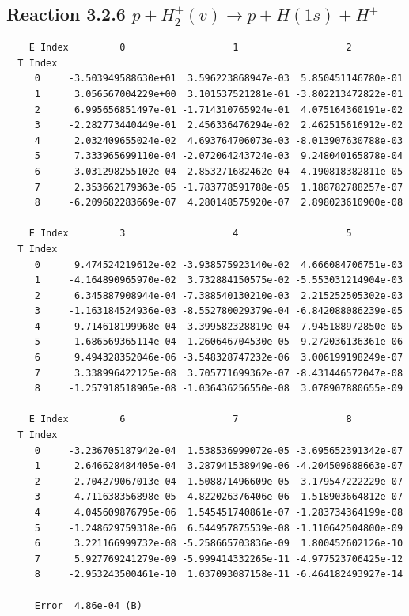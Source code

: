 \documentclass[12pt,dvipdfmx]{article}
\begin{document}
\newpage
\subsection{
Reaction 3.2.6 $   p + H_2^+(v) \rightarrow p + H(1s) + H^+$}


\begin{small}\begin{verbatim}
    E Index         0                   1                   2
  T Index
     0     -3.503949588630e+01  3.596223868947e-03  5.850451146780e-01
     1      3.056567004229e+00  3.101537521281e-01 -3.802213472822e-01
     2      6.995656851497e-01 -1.714310765924e-01  4.075164360191e-02
     3     -2.282773440449e-01  2.456336476294e-02  2.462515616912e-02
     4      2.032409655024e-02  4.693764706073e-03 -8.013907630788e-03
     5      7.333965699110e-04 -2.072064243724e-03  9.248040165878e-04
     6     -3.031298255102e-04  2.853271682462e-04 -4.190818382811e-05
     7      2.353662179363e-05 -1.783778591788e-05  1.188782788257e-07
     8     -6.209682283669e-07  4.280148575920e-07  2.898023610900e-08

    E Index         3                   4                   5
  T Index
     0      9.474524219612e-02 -3.938575923140e-02  4.666084706751e-03
     1     -4.164890965970e-02  3.732884150575e-02 -5.553031214904e-03
     2      6.345887908944e-04 -7.388540130210e-03  2.215252505302e-03
     3     -1.163184524936e-03 -8.552780029379e-04 -6.842088086239e-05
     4      9.714618199968e-04  3.399582328819e-04 -7.945188972850e-05
     5     -1.686569365114e-04 -1.260646704530e-05  9.272036136361e-06
     6      9.494328352046e-06 -3.548328747232e-06  3.006199198249e-07
     7      3.338996422125e-08  3.705771699362e-07 -8.431446572047e-08
     8     -1.257918518905e-08 -1.036436256550e-08  3.078907880655e-09

    E Index         6                   7                   8
  T Index
     0     -3.236705187942e-04  1.538536999072e-05 -3.695652391342e-07
     1      2.646628484405e-04  3.287941538949e-06 -4.204509688663e-07
     2     -2.704279067013e-04  1.508871496609e-05 -3.179547222229e-07
     3      4.711638356898e-05 -4.822026376406e-06  1.518903664812e-07
     4      4.045609876795e-06  1.545451740861e-07 -1.283734364199e-08
     5     -1.248629759318e-06  6.544957875539e-08 -1.110642504800e-09
     6      3.221166999732e-08 -5.258665703836e-09  1.800452602126e-10
     7      5.927769241279e-09 -5.999414332265e-11 -4.977523706425e-12
     8     -2.953243500461e-10  1.037093087158e-11 -6.464182493927e-14

     Error  4.86e-04 (B)
\end{verbatim}\end{small}
\end{document}
